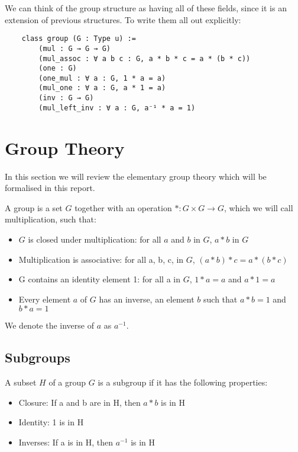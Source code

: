 \documentclass[runningheads,a4paper]{llncs}
\renewcommand{\-}{\setminus}
\begin{document}
We can think of the group structure as having all of these fields, since it is an extension of previous structures. To write them all out explicitly:

\begin{lstlisting}
    class group (G : Type u) :=
        (mul : G → G → G)
        (mul_assoc : ∀ a b c : G, a * b * c = a * (b * c))
        (one : G)
        (one_mul : ∀ a : G, 1 * a = a)
        (mul_one : ∀ a : G, a * 1 = a)
        (inv : G → G)
        (mul_left_inv : ∀ a : G, a⁻¹ * a = 1)
\end{lstlisting}

\pagebreak

\section{Group Theory}

In this section we will review the elementary group theory\cite{artin} which will be formalised in this report.

\begin{definition}[Group] 
A group is a set $G$ together with an operation $* : G \times G \to G$, which we will call multiplication, such that:
\begin{itemize}
\item $G$ is closed under multiplication: for all $a$ and $b$ in $G$, $a*b$ in $G$
\item Multiplication is associative: for all a, b, c, in $G$, $(a*b)*c = a*(b*c)$
\item G contains an identity element 1: for all a in $G$, $1*a = a$ and $a*1=a$
\item Every element $a$ of $G$ has an inverse, an element $b$ such that $a*b = 1$ and $b*a =1$
\end{itemize}

We denote the inverse of $a$ as $a^{-1}$.
\end{definition}

\subsection{Subgroups}

\begin{definition}[Subgroup]
A subset $H$ of a group $G$ is a subgroup if it has the following properties:
\begin{itemize}
\item Closure: If a and b are in H, then $a * b$ is in H
\item Identity: 1 is in H
\item Inverses: If a is in H, then $a^{-1}$ is in H
\end{itemize}
\end{definition}
\end{document}
